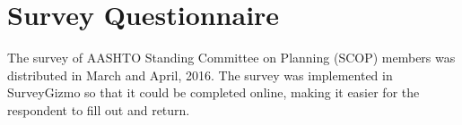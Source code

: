 \chapter{Survey Questionnaire}\label{sec:appendix-a-survey-questionnaire}

The survey of AASHTO Standing Committee on Planning (SCOP) members was distributed in March and April, 2016. The survey was implemented in SurveyGizmo so that it could be completed online, making it easier for the respondent to fill out and return.


